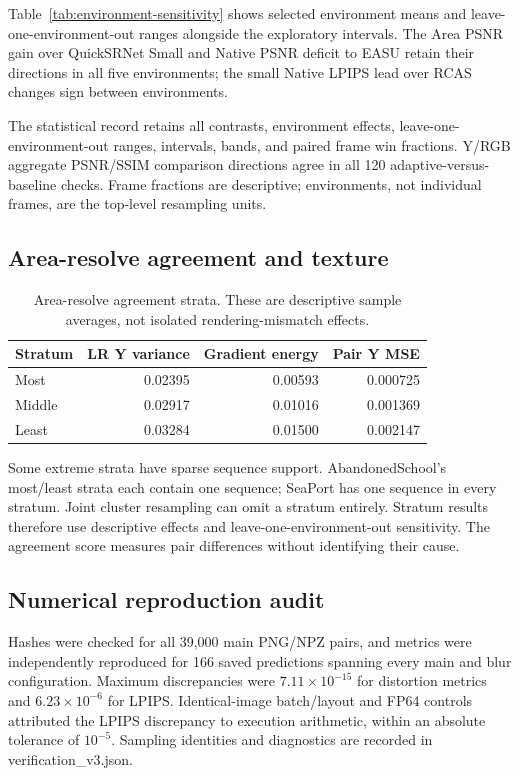 \documentclass[10pt,twocolumn,letterpaper]{article}
\begin{document}

Table~\ref{tab:environment-sensitivity} shows selected environment means and leave-one-environment-out ranges alongside the exploratory intervals.
The Area PSNR gain over QuickSRNet Small and Native PSNR deficit to EASU retain their directions in all five environments; the small Native LPIPS lead over RCAS changes sign between environments.

The statistical record retains all contrasts, environment effects, leave-one-environment-out ranges, intervals, bands, and paired frame win fractions.
Y/RGB aggregate PSNR/SSIM comparison directions agree in all 120 adaptive-versus-baseline checks.
Frame fractions are descriptive; environments, not individual frames, are the top-level resampling units.

\subsection{Area-resolve agreement and texture}
\begin{table}[h]
\centering\small
\caption{Area-resolve agreement strata. These are descriptive sample averages, not isolated rendering-mismatch effects.}
\begin{tabular}{lrrr}
\toprule
Stratum & LR Y variance & Gradient energy & Pair Y MSE\\
\midrule
Most &0.02395&0.00593&0.000725\\
Middle &0.02917&0.01016&0.001369\\
Least &0.03284&0.01500&0.002147\\
\bottomrule
\end{tabular}
\end{table}
Some extreme strata have sparse sequence support.
AbandonedSchool's most/least strata each contain one sequence; SeaPort has one sequence in every stratum.
Joint cluster resampling can omit a stratum entirely.
Stratum results therefore use descriptive effects and leave-one-environment-out sensitivity.
The agreement score measures pair differences without identifying their cause.

\subsection{Numerical reproduction audit}
Hashes were checked for all 39,000 main PNG/NPZ pairs, and metrics were independently reproduced for 166 saved predictions spanning every main and blur configuration.
Maximum discrepancies were $7.11\times10^{-15}$ for distortion metrics and $6.23\times10^{-6}$ for LPIPS.
Identical-image batch/layout and FP64 controls attributed the LPIPS discrepancy to execution arithmetic, within an absolute tolerance of $10^{-5}$.
Sampling identities and diagnostics are recorded in \textnormal{verification\_v3.json}.
\end{document}
